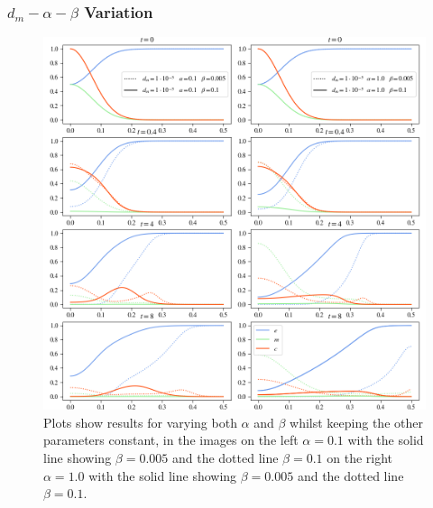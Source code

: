 \subsubsection*{$d_m - \alpha - \beta$ Variation}
\begin{figure}[h!]
    \centering
    \includegraphics[width=\textwidth]{resources/images/dm_alpha_beta_variation_1.png}
    \caption{Plots show results for varying both $\alpha$ and $\beta$ whilst keeping the other parameters constant, in the images on the left $\alpha=0.1$ with the solid line showing $\beta = 0.005$ and the dotted line $\beta=0.1$ on the right $\alpha=1.0$ with the solid line showing $\beta = 0.005$ and the dotted line $\beta=0.1$.}
    \label{fig:dm_alpha_beta_variation_1}
\end{figure}
